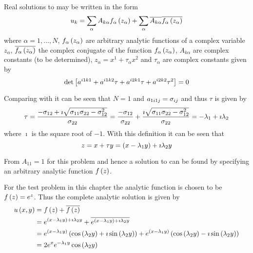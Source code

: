 Real solutions to  may be written in
the form 
\begin{equation}
  u_{k}= \displaystyle\sum _{\alpha}A_{k\alpha} f_{\alpha}\left( z_{\alpha} \right) +
   \displaystyle\sum _{\alpha}\overline{A_{k\alpha}}\overline{ f_{\alpha}\left( z_{\alpha} \right) }
\end{equation}
where $\alpha=1,\hdots,N$, $ f_{\alpha}\left( z_{\alpha} \right) $ are arbitrary
analytic functions of a complex variable $z_{\alpha}$,
$\overline{ f_{\alpha}\left( z_{\alpha} \right) }$ the complex conjugate of the
function $ f_{\alpha}\left( z_{\alpha} \right) $, $A_{k\alpha}$ are complex constants
(to be determined), $z_{\alpha}=x^{1}+\tau_{\alpha} x^{2}$ and $\tau_{\alpha}$
are complex constants given by
\begin{equation}
  \det\left[ a^{i1k1}+a^{i1k2}\tau+a^{i2k1}\tau+a^{i2k2}\tau^{2} \right]=0
\end{equation}

Comparing  with
 it can be seen that $N=1$ and
$a_{1i1j}= \sigma _{ij}$ and thus $\tau$ is given by
\begin{equation}
  \tau=\dfrac{- \sigma _{12}+
    \imath\sqrt{ \sigma _{11} \sigma _{22}- \sigma _{12}^{2}}}
  { \sigma _{22}}=\dfrac{- \sigma _{12}}{ \sigma _{22}}+\dfrac{\imath\sqrt{
       \sigma _{11} \sigma _{22}-
       \sigma _{12}^{2}}}{ \sigma _{22}}=-\lambda_{1}+\imath\lambda_{2}
\end{equation}
where $\imath$ is the square root of $-1$. With this definition it can be seen
that
\begin{equation}
  z=x+\tau y=\left( x-\lambda_{1}y \right)+\imath\lambda_{2}y
\end{equation}

From \citet{clements:1981} $A_{11}=1$ for this problem and hence a
solution to  can be found by specifying an
arbitrary analytic function $ f\left( z \right) $.

For the test problem in this chapter the analytic function is chosen to be
$ f\left( z \right) =e^{z}$. Thus the complete analytic solution is given by
\begin{equation}
  \begin{split}
    \fnof{u}{x,y}&=\fnof{f}{z}+\overline{\fnof{f}{z}} \\
    &= e^{\pbrac{x-\lambda_{1}y}+\imath\lambda_{2}y}+
    \overline{e^{\pbrac{x-\lambda_{1}y}+\imath\lambda_{2}y}} \\
    &= e^{\pbrac{x-\lambda_{1}y}}\pbrac{\cosine{\lambda_{2}y}+\imath
      \sine{\lambda_{2}y}}+e^{\pbrac{x-\lambda_{1}y}}
    \pbrac{\cosine{\lambda_{2}y}-\imath\sine{\lambda_{2}y}} \\
    &= 2e^{x}e^{-\lambda_{1}{y}}\cosine{\lambda_{2}y}
  \end{split}
  \label{eqn:GeneralisedLaplaceTwoDAnalytic1}
\end{equation}


